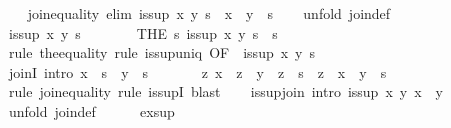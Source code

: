 \begin{isabellebody}
\isanewline
\ \ \isamarkupfalse%
\ join{\isacharunderscore}equality\ {\isacharbrackleft}elim{\isacharquery}{\isacharbrackright}{\isacharcolon}\ {\isachardoublequoteopen}is{\isacharunderscore}sup\ x\ y\ s\ {\isasymLongrightarrow}\ x\ {\isasymsqunion}\ y\ {\isacharequal}\ s{\isachardoublequoteclose}\isanewline
\ \ \isamarkupfalse%
\ {\isacharparenleft}unfold\ join{\isacharunderscore}def{\isacharparenright}\isanewline
\ \ \ \ \isamarkupfalse%
\ {\isachardoublequoteopen}is{\isacharunderscore}sup\ x\ y\ s{\isachardoublequoteclose}\isanewline
\ \ \ \ \isamarkupfalse%
\ \isamarkupfalse%
\ {\isachardoublequoteopen}{\isacharparenleft}THE\ s{\isachardot}\ is{\isacharunderscore}sup\ x\ y\ s{\isacharparenright}\ {\isacharequal}\ s{\isachardoublequoteclose}\isanewline
\ \ \ \ \ \ \isamarkupfalse%
\ {\isacharparenleft}rule\ the{\isacharunderscore}equality{\isacharparenright}\ {\isacharparenleft}rule\ is{\isacharunderscore}sup{\isacharunderscore}uniq\ {\isacharbrackleft}OF\ {\isacharunderscore}\ {\isacharbackquoteopen}is{\isacharunderscore}sup\ x\ y\ s{\isacharbackquoteclose}{\isacharbrackright}{\isacharparenright}\isanewline
\ \ \isamarkupfalse%
\isanewline
\isanewline
\ \ \isamarkupfalse%
\ joinI\ {\isacharbrackleft}intro{\isacharquery}{\isacharbrackright}{\isacharcolon}\ {\isachardoublequoteopen}x\ {\isasymsqsubseteq}\ s\ {\isasymLongrightarrow}\ y\ {\isasymsqsubseteq}\ s\ {\isasymLongrightarrow}\isanewline
\ \ \ \ \ \ {\isacharparenleft}{\isasymAnd}z{\isachardot}\ x\ {\isasymsqsubseteq}\ z\ {\isasymLongrightarrow}\ y\ {\isasymsqsubseteq}\ z\ {\isasymLongrightarrow}\ s\ {\isasymsqsubseteq}\ z{\isacharparenright}\ {\isasymLongrightarrow}\ x\ {\isasymsqunion}\ y\ {\isacharequal}\ s{\isachardoublequoteclose}\isanewline
\ \ \ \ \isamarkupfalse%
\ {\isacharparenleft}rule\ join{\isacharunderscore}equality{\isacharcomma}\ rule\ is{\isacharunderscore}supI{\isacharparenright}\ blast{\isacharplus}\isanewline
\isanewline
\ \ \isamarkupfalse%
\ is{\isacharunderscore}sup{\isacharunderscore}join\ {\isacharbrackleft}intro{\isacharquery}{\isacharbrackright}{\isacharcolon}\ {\isachardoublequoteopen}is{\isacharunderscore}sup\ x\ y\ {\isacharparenleft}x\ {\isasymsqunion}\ y{\isacharparenright}{\isachardoublequoteclose}\isanewline
\ \ \isamarkupfalse%
\ {\isacharparenleft}unfold\ join{\isacharunderscore}def{\isacharparenright}\isanewline
\ \ \ \ \isamarkupfalse%
\ ex{\isacharunderscore}sup\ \isamarkupfalse%

\end{isabellebody}
